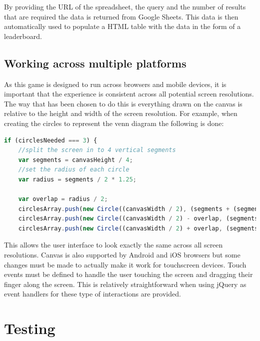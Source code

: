 \documentclass[12pt,a4paper]{report}
\begin{document}
By providing the URL of the spreadsheet, the query and the number of results that are required the data is returned from Google Sheets. This data is then automatically used to populate a HTML table with the data in the form of a leaderboard.

\section{Working across multiple platforms}
As this game is designed to run across browsers and mobile devices, it is important that the experience is consistent across all potential screen resolutions. The way that has been chosen to do this is everything drawn on the canvas is relative to the height and width of the screen resolution. 
For example, when creating the circles to represent the venn diagram the following is done:

\begin{minipage}{\linewidth}
\begin{lstlisting}[language=JavaScript]
if (circlesNeeded === 3) {
    //split the screen in to 4 vertical segments
    var segments = canvasHeight / 4;
    //set the radius of each circle
    var radius = segments / 2 * 1.25;

    var overlap = radius / 2;
    circlesArray.push(new Circle((canvasWidth / 2), (segments + (segments * 2)) / 2 + (segments / 6), radius));
    circlesArray.push(new Circle((canvasWidth / 2) - overlap, (segments * 2 + (segments * 3)) / 2 - (segments / 6), radius));
    circlesArray.push(new Circle((canvasWidth / 2) + overlap, (segments * 2 + (segments * 3)) / 2 - (segments / 6), radius));

\end{lstlisting}
\end{minipage}

This allows the user interface to look exactly the same across all screen resolutions. Canvas is also supported by Android and iOS browsers but some changes must be made to actually make it work for touchscreen devices. Touch events must be defined to handle the user touching the screen and dragging their finger along the screen. This is relatively straightforward when using jQuery as event handlers for these type of interactions are provided.





\chapter{Testing}
\end{document}
